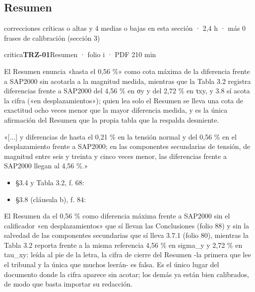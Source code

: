 \subsection{Resumen}
{\small\color{gris} correcciones críticas o altas y 4 medias o bajas en esta sección · 2,4 h · más 0 frases de calibración (sección 3)}\par
\begin{ficha}{critica}{\casilla\textbf{TRZ-01}\quad{}\quad Resumen · folio i · PDF 2\hfill 10 min}
\par
{}El Resumen enuncia «hasta el 0,56 \%» como cota máxima de la diferencia frente a SAP2000 sin acotarla a la magnitud medida, mientras que la Tabla 3.2 registra diferencias frente a SAP2000 del 4,56 \% en σy y del 2,72 \% en τxy, y 3.8 sí acota la cifra («en desplazamientos»); quien lea solo el Resumen se lleva una cota de exactitud ocho veces menor que la mayor diferencia medida, y es la única afirmación del Resumen que la propia tabla que la respalda desmiente.\par
{}«[...]\allowbreak{} y diferencias de hasta el 0,21 \% en la tensión normal y del 0,56 \% en el desplazamiento frente a SAP2000; en las componentes secundarias de tensión, de magnitud entre seis y treinta y cinco veces menor, las diferencias frente a SAP2000 llegan al 4,56 \%.»\par
{}\begin{itemize}[leftmargin=1.2em,itemsep=1pt,topsep=1pt]
\item {\small §3.4 y Tabla 3.2, f. 68: }
\item {\small §3.8 (cláusula b), f. 84: }
\end{itemize}
{\small\color{gris}El Resumen da el 0,56 \% como diferencia máxima frente a SAP2000 sin el calificador «en desplazamientos» que sí llevan las Conclusiones (folio 88) y sin la salvedad de las componentes secundarias que sí lleva 3.7.1 (folio 80), mientras la Tabla 3.2 reporta frente a la misma referencia 4,56 \% en sigma\_\allowbreak{}y y 2,72 \% en tau\_\allowbreak{}xy: leída al pie de la letra, la cifra de cierre del Resumen -la primera que lee el tribunal y la única que muchos leerán- es falsa. Es el único lugar del documento donde la cifra aparece sin acotar; los demás ya están bien calibrados, de modo que basta importar su redacción.\par}

\end{ficha}
